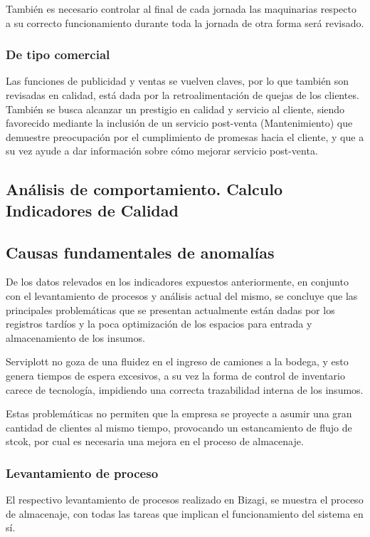 	
	También es necesario controlar al final de cada jornada las maquinarias respecto a su correcto funcionamiento durante toda la jornada de otra forma será revisado.
	
	
	\subsubsection{De tipo comercial}
	
	Las funciones de publicidad y ventas se vuelven claves, por lo que también son revisadas en calidad, está dada por la retroalimentación de quejas de los clientes. También se busca alcanzar un prestigio en calidad y servicio al cliente, siendo favorecido mediante la inclusión de un servicio post-venta (Mantenimiento) que demuestre preocupación por el cumplimiento de promesas hacia el cliente, y que a su vez ayude a dar información sobre cómo mejorar servicio post-venta.
	
	
	
	\subsection{Análisis de comportamiento. Calculo Indicadores de Calidad}
	
	
	\subsection{Causas fundamentales de anomalías}
	De los datos relevados en los indicadores expuestos anteriormente, en conjunto con el levantamiento de procesos y análisis actual del mismo, se concluye que las principales problemáticas que se presentan actualmente están dadas por los registros tardíos y la poca optimización de los espacios para entrada y almacenamiento de los insumos.
	
	
	Serviplott no goza de una fluidez en el ingreso de camiones a la bodega, y esto genera tiempos de espera excesivos, a su vez la forma de control de inventario carece de tecnología, impidiendo una correcta trazabilidad interna de los insumos.
	

Estas problemáticas no permiten que la empresa se proyecte a asumir una gran cantidad de clientes al mismo tiempo, provocando un estancamiento de flujo de stcok, por cual es necesaria una mejora en el proceso de almacenaje.
    \subsubsection{Levantamiento de proceso}
    El respectivo levantamiento de procesos realizado en Bizagi, se muestra el proceso de almacenaje, con todas las tareas que implican el funcionamiento del sistema en sí.

